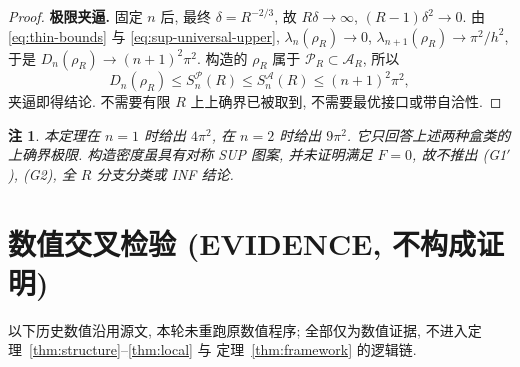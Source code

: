 \documentclass[UTF8]{ctexart}
\newtheorem{remark}[theorem]{注}
\begin{document}
\begin{proof}
\textbf{极限夹逼.} 固定 $n$ 后, 最终 $\delta=R^{-2/3}$,
故 $R\delta\to\infty$, $(R-1)\delta^2\to0$.
由 \eqref{eq:thin-bounds} 与 \eqref{eq:sup-universal-upper},
$\lambda_n(\rho_R)\to0$, $\lambda_{n+1}(\rho_R)\to\pi^2/h^2$,
于是 $D_n(\rho_R)\to(n+1)^2\pi^2$.
构造的 $\rho_R$ 属于 $\mathcal P_R\subset\mathcal A_R$, 所以
\begin{equation*}
D_n(\rho_R)\le S_n^{\mathcal P}(R)\le S_n^{\mathcal A}(R)\le(n+1)^2\pi^2,
\end{equation*}
夹逼即得结论. 不需要有限 $R$ 上上确界已被取到, 不需要最优接口或带自洽性.
\end{proof}

\begin{remark}
本定理在 $n=1$ 时给出 $4\pi^2$, 在 $n=2$ 时给出 $9\pi^2$.
它只回答上述两种盒类的上确界极限. 构造密度虽具有对称 SUP 图案,
并未证明满足 $F=0$, 故不推出 (G1$'$), (G2), 全 $R$ 分支分类或 INF 结论.
\end{remark}

\section{数值交叉检验 (EVIDENCE, 不构成证明)}\label{sec:evidence}

以下历史数值沿用源文, 本轮未重跑原数值程序; 全部仅为数值证据, 不进入定理~\ref{thm:structure}--\ref{thm:local} 与
定理~\ref{thm:framework} 的逻辑链.
\end{document}
